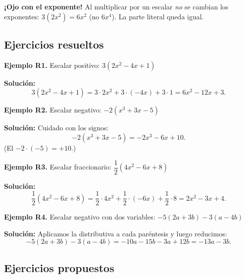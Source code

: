 \documentclass[12pt, letterpaper]{article}
\begin{document}
\begin{cuadroextra}
  \textbf{¡Ojo con el exponente!} Al multiplicar por un escalar \emph{no} se cambian los exponentes: $3(2x^2) = 6x^2$ (no $6x^4$). La parte literal queda igual.
\end{cuadroextra}

\subsection{Ejercicios resueltos}

\textbf{Ejemplo R1.} Escalar positivo: $3(2x^2 - 4x + 1)$

\begin{cuadrosolucion}
  \textbf{Solución:}
  $$3(2x^2 - 4x + 1) = 3 \cdot 2x^2 + 3 \cdot (-4x) + 3 \cdot 1 = 6x^2 - 12x + 3.$$
\end{cuadrosolucion}

\textbf{Ejemplo R2.} Escalar negativo: $-2(x^3 + 3x - 5)$

\begin{cuadrosolucion}
  \textbf{Solución:} Cuidado con los signos:
  $$-2(x^3 + 3x - 5) = -2x^3 - 6x + 10.$$
  (El $-2 \cdot (-5) = +10$.)
\end{cuadrosolucion}

\textbf{Ejemplo R3.} Escalar fraccionario: $\dfrac{1}{2}(4x^2 - 6x + 8)$

\begin{cuadrosolucion}
  \textbf{Solución:}
  $$\frac{1}{2}(4x^2 - 6x + 8) = \frac{1}{2} \cdot 4x^2 + \frac{1}{2} \cdot (-6x) + \frac{1}{2} \cdot 8 = 2x^2 - 3x + 4.$$
\end{cuadrosolucion}

\newpage

\textbf{Ejemplo R4.} Escalar negativo con dos variables: $-5(2a + 3b) - 3(a - 4b)$

\begin{cuadrosolucion}
  \textbf{Solución:} Aplicamos la distributiva a cada paréntesis y luego reducimos:
  $$-5(2a + 3b) - 3(a - 4b) = -10a - 15b - 3a + 12b = -13a - 3b.$$
\end{cuadrosolucion}

\subsection{Ejercicios propuestos}
\end{document}
